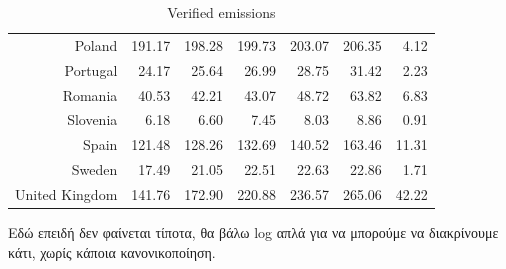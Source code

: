 \documentclass[a4paper,twoside,10pt]{article}
\begin{document}
\begin{table}[H]
\begin{tabular}{|r|rrrrr|r|}
Poland & 191.17 & 198.28 & 199.73 & 203.07 & 206.35 & 4.12 \\ 
Portugal & 24.17 & 25.64 & 26.99 & 28.75 & 31.42 & 2.23 \\   \hline
Romania & 40.53 & 42.21 & 43.07 & 48.72 & 63.82 & 6.83 \\ 
Slovenia & 6.18 & 6.60 & 7.45 & 8.03 & 8.86 & 0.91 \\ 
Spain & 121.48 & 128.26 & 132.69 & 140.52 & 163.46 & 11.31 \\ 
Sweden & 17.49 & 21.05 & 22.51 & 22.63 & 22.86 & 1.71 \\ 
United Kingdom & 141.76 & 172.90 & 220.88 & 236.57 & 265.06 & 42.22 \\ 
\hline
	\end{tabular}
	\caption{Verified emissions}
	\label{Verified emissions}
\end{table}
Εδώ επειδή δεν φαίνεται τίποτα, θα βάλω log απλά για να μπορούμε να διακρίνουμε κάτι, χωρίς κάποια κανονικοποίηση.
\end{document}
